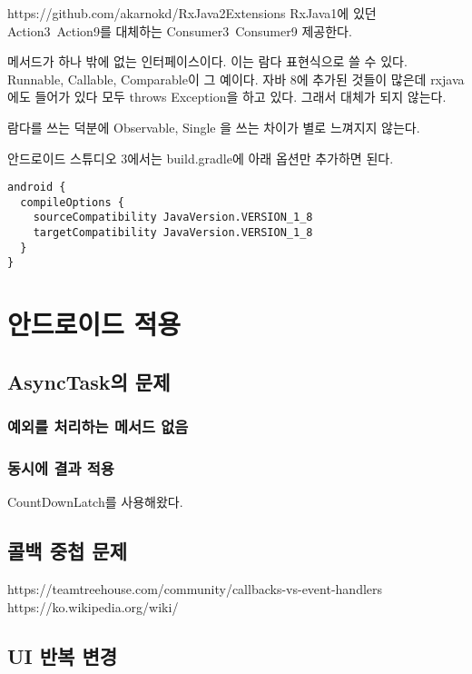 \documentclass{book}
\begin{document}
https://github.com/akarnokd/RxJava2Extensions
RxJava1에 있던 Action3~Action9를 대체하는 Consumer3~Consumer9  제공한다.

메서드가 하나 밖에 없는 인터페이스이다.
이는 람다 표현식으로 쓸 수 있다.
Runnable, Callable, Comparable이 그 예이다.
자바 8에 추가된 것들이 많은데 rxjava에도 들어가 있다
모두 throws Exception을 하고 있다. 그래서 대체가 되지 않는다.

람다를 쓰는 덕분에 Observable, Single 을 쓰는 차이가 별로 느껴지지 않는다.


안드로이드 스튜디오 3에서는 build.gradle에 아래 옵션만 추가하면 된다.
\begin{verbatim}
android {
  compileOptions {
    sourceCompatibility JavaVersion.VERSION_1_8
    targetCompatibility JavaVersion.VERSION_1_8
  }
}
\end{verbatim}

\begin{comment}
Java8을 지원하면 내용이 제거되니 지금은 대강만 쓰자.
자바 8부터 지원하는 람다식을 쓸 수 있다.
안드로이드 스튜디오에서 사용방법은 https://github.com/evant/gradle-retrolambda를 참고하자.
\end{comment}

\chapter{안드로이드 적용}
\section{AsyncTask의 문제}
\subsection{예외를 처리하는 메서드 없음}


\subsection{동시에 결과 적용}
CountDownLatch를 사용해왔다.

\section{콜백 중첩 문제}
https://teamtreehouse.com/community/callbacks-vs-event-handlers
https://ko.wikipedia.org/wiki/%

\section{UI 반복 변경}
\end{document}
